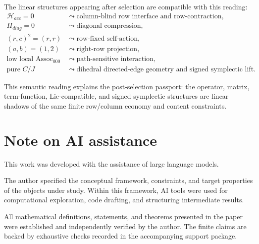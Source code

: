 \documentclass[11pt]{article}
\theoremstyle{definition}
\begin{document}
The linear structures appearing after selection are compatible with this
reading:
\[
\begin{aligned}
\mathcal H_{acc}=0
&\leadsto
\text{column-blind row interface and row-contraction},\\
H_{diag}=0
&\leadsto
\text{diagonal compression},\\
(r,c)^2=(r,r)
&\leadsto
\text{row-fixed self-action},\\
(a,b)=(1,2)
&\leadsto
\text{right-row projection},\\
\text{low local }\operatorname{Assoc}_{000}
&\leadsto
\text{path-sensitive interaction},\\
\text{pure }C/J
&\leadsto
\text{dihedral directed-edge geometry and signed symplectic lift}.
\end{aligned}
\]

This semantic reading explains the post-selection passport: the operator,
matrix, term-function, Lie-compatible, and signed symplectic structures are
linear shadows of the same finite row/column economy and content constraints.


\section*{Note on AI assistance}

This work was developed with the assistance of large language models.

The author specified the conceptual framework, constraints, and target
properties of the objects under study. Within this framework, AI tools
were used for computational exploration, code drafting, and structuring
intermediate results.

All mathematical definitions, statements, and theorems presented in the
paper were established and independently verified by the author. The
finite claims are backed by exhaustive checks recorded in the
accompanying support package.
\end{document}
